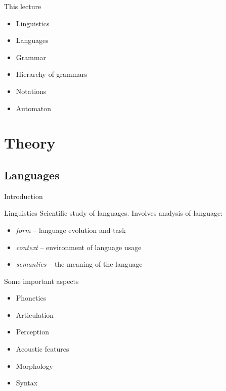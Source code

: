 \documentclass{beamer}
\begin{document}
\begin{frame}{This lecture}
\begin{itemize}
\item Linguistics
\item Languages
\item Grammar
\item Hierarchy of grammars
\item Notations
\item Automaton
\end{itemize}
\end{frame}

\section{Theory}

\subsection{Languages}

\begin{frame}{Introduction}

\begin{block}{Linguistics}
Scientific study of languages. Involves analysis of language:
\begin{itemize}
\item \textit{form} -- language evolution and task
\item \textit{context} -- environment of language usage
\item \textit{semantics} -- the meaning of the language
\end{itemize}
\end{block}

\begin{block}{Some important aspects}
\begin{itemize}
\item Phonetics
\item Articulation
\item Perception
\item Acoustic features
\item Morphology
\item Syntax
\end{itemize}
\end{block}

\end{frame}
\end{document}
